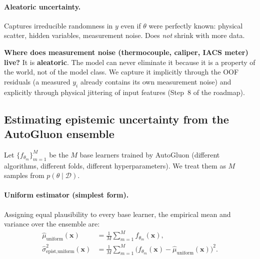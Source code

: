 \documentclass[11pt,a4paper]{article}
\begin{document}
\paragraph{Aleatoric uncertainty.} Captures irreducible randomness in $y$ even if $\theta$ were perfectly known: physical scatter, hidden variables, measurement noise. Does \emph{not} shrink with more data.

\begin{intuitionbox}
\textbf{Where does measurement noise (thermocouple, caliper, IACS meter) live?} It is \textbf{aleatoric}. The model can never eliminate it because it is a property of the world, not of the model class. We capture it implicitly through the OOF residuals (a measured $y_i$ already contains its own measurement noise) and explicitly through physical jittering of input features (Step~8 of the roadmap).
\end{intuitionbox}

\subsection{Estimating epistemic uncertainty from the AutoGluon ensemble}
\label{sec:epistemic-estimation}

Let $\{f_{\theta_m}\}_{m=1}^M$ be the $M$ base learners trained by AutoGluon (different algorithms, different folds, different hyperparameters). We treat them as $M$ samples from $p(\theta \mid \mathcal{D})$.

\paragraph{Uniform estimator (simplest form).} Assigning equal plausibility to every base learner, the empirical mean and variance over the ensemble are:
\begin{align}
\hat\mu_{\text{uniform}}(\bm x) &= \frac{1}{M} \sum_{m=1}^M f_{\theta_m}(\bm x),
\label{eq:mu-hat}\\
\hat\sigma^2_{\text{epist},\text{uniform}}(\bm x) &= \frac{1}{M} \sum_{m=1}^M \big(f_{\theta_m}(\bm x) - \hat\mu_{\text{uniform}}(\bm x)\big)^2.
\label{eq:sigma-epist}
\end{align}
\end{document}
